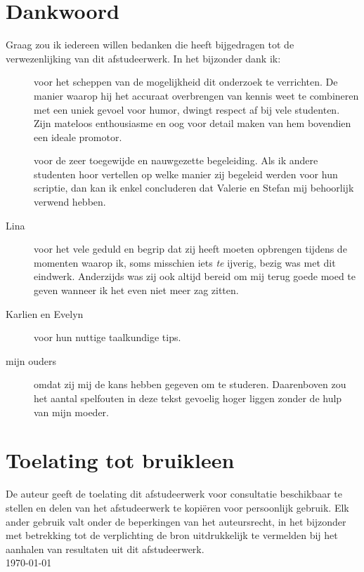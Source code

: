 \newpage
\thispagestyle{plain}

\section*{Dankwoord}
Graag zou ik iedereen willen bedanken die heeft bijgedragen tot de
verwezenlijking van dit afstudeerwerk. In het bijzonder dank ik:
\begin{description}
\item[\promotor] voor het scheppen van de mogelijkheid dit 
onderzoek te verrichten. 
De manier waarop hij het accuraat overbrengen van kennis weet te combineren
met een uniek gevoel voor humor, dwingt respect af bij vele studenten. Zijn 
mateloos enthousiasme en oog voor detail maken van hem bovendien 
een ideale promotor.
\item[\begeleider] voor de zeer toegewijde en nauwgezette begeleiding. Als ik andere
studenten hoor vertellen op welke manier zij begeleid werden voor hun scriptie, dan kan 
ik enkel concluderen dat Valerie en Stefan mij behoorlijk verwend hebben.
\item[Lina] voor het vele geduld en begrip dat zij heeft moeten opbrengen tijdens de 
momenten waarop ik, soms misschien iets \emph{te} ijverig, bezig was met dit
eindwerk. Anderzijds was zij ook altijd bereid om mij terug goede moed te geven
wanneer ik het even niet meer zag zitten.
\item[Karlien en Evelyn] voor hun nuttige taalkundige tips.
\item[mijn ouders] omdat zij mij de kans hebben gegeven om te studeren. Daarenboven
zou het aantal spelfouten in deze tekst gevoelig hoger liggen
zonder de hulp van mijn moeder.
\end{description}
\vfill


\section*{Toelating tot bruikleen}
De auteur geeft de toelating dit afstudeerwerk voor consultatie 
beschikbaar te stellen en delen van het afstudeerwerk te kopi\"eren voor
persoonlijk gebruik. Elk ander gebruik valt onder de beperkingen van het 
auteursrecht, in het bijzonder met betrekking tot de verplichting de bron 
uitdrukkelijk te vermelden bij het aanhalen van resultaten uit dit 
afstudeerwerk.
\\[1cm]
\auteur\hfill \today
\\[1cm]